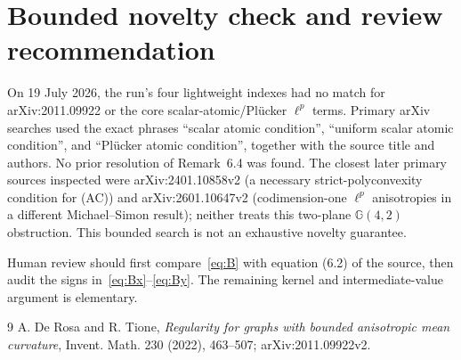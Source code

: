 \documentclass[11pt]{article}
\newcommand{\G}{\mathbb{G}}
\begin{document}
\section{Bounded novelty check and review recommendation}

On 19 July 2026, the run's four lightweight indexes had no match for
arXiv:2011.09922 or the core scalar-atomic/Pl\"ucker $\ell^p$ terms.  Primary
arXiv searches used the exact phrases ``scalar atomic condition'', ``uniform
scalar atomic condition'', and ``Pl\"ucker atomic condition'', together with
the source title and authors.  No prior resolution of Remark~6.4 was found.
The closest later primary sources inspected were arXiv:2401.10858v2 (a
necessary strict-polyconvexity condition for (AC)) and arXiv:2601.10647v2
(codimension-one $\ell^p$ anisotropies in a different Michael--Simon result);
neither treats this two-plane $\G(4,2)$ obstruction.  This bounded search is
not an exhaustive novelty guarantee.

Human review should first compare~\eqref{eq:B} with equation (6.2) of the
source, then audit the signs in~\eqref{eq:Bx}--\eqref{eq:By}.  The remaining
kernel and intermediate-value argument is elementary.

\begin{thebibliography}{9}
A. De Rosa and R. Tione,
\emph{Regularity for graphs with bounded anisotropic mean curvature},
Invent. Math. 230 (2022), 463--507;
arXiv:2011.09922v2.
\end{thebibliography}
\end{document}
